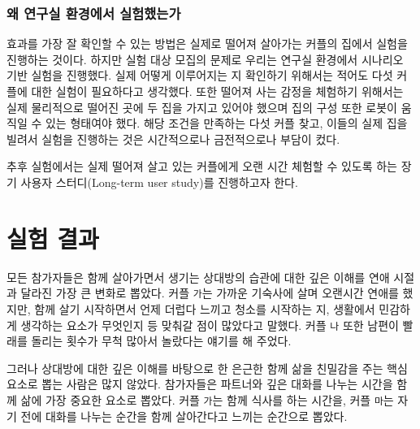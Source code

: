 
\subsubsection{왜 연구실 환경에서 실험했는가}

 효과를 가장 잘 확인할 수 있는 방법은 실제로 떨어져 살아가는 커플의 집에서 실험을 진행하는 것이다. 하지만 실험 대상 모집의 문제로 우리는 연구실 환경에서 시나리오 기반 실험을 진행했다. 실제 \concept\가 어떻게 이루어지는 지 확인하기 위해서는 적어도 다섯 커플에 대한 실험이 필요하다고 생각했다. 또한 떨어져 사는 감정을 체험하기 위해서는 실제 물리적으로 떨어진 곳에 두 집을 가지고 있어야 했으며 집의 구성 또한 로봇이 움직일 수 있는 형태여야 했다. 해당 조건을 만족하는 다섯 커플 찾고, 이들의 실제 집을 빌려서 실험을 진행하는 것은 시간적으로나 금전적으로나 부담이 컸다.

추후 실험에서는 실제 떨어져 살고 있는 커플에게 \sysname\을 오랜 시간 체험할 수 있도록 하는 장기 사용자 스터디(Long-term user study)를 진행하고자 한다.


\section{실험 결과}



모든 참가자들은 함께 살아가면서 생기는 상대방의 습관에 대한 깊은 이해를 연애 시절과 달라진 가장 큰 변화로 뽑았다. 커플 \texttt{가}는 가까운 기숙사에 살며 오랜시간 연애를 했지만, 함께 살기 시작하면서 언제 더럽다 느끼고 청소를 시작하는 지, 생활에서 민감하게 생각하는 요소가 무엇인지 등 맞춰갈 점이 많았다고 말했다. 커플 \texttt{나} 또한 남편이 빨래를 돌리는 횟수가 무척 많아서 놀랐다는 얘기를 해 주었다.

그러나 상대방에 대한 깊은 이해를 바탕으로 한 은근한 함께 삶을 친밀감을 주는 핵심 요소로 뽑는 사람은 많지 않았다. 참가자들은 파트너와 깊은 대화를 나누는 시간을 함께 삶에 가장 중요한 요소로 뽑았다. 커플 \texttt{가}는 함께 식사를 하는 시간을, 커플 \texttt{마}는 자기 전에 대화를 나누는 순간을 함께 살아간다고 느끼는 순간으로 뽑았다.

